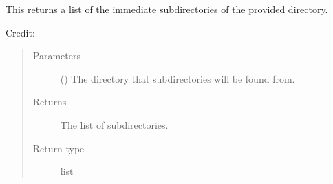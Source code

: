 \documentclass[letterpaper,10pt,english]{sphinxmanual}
\begin{document}

\begin{fulllineitems}
\label{\detokenize{docstrings/ifa_smeargle.core.io:ifa_smeargle.core.io.get_subdirectories}}
This returns a list of the immediate subdirectories of the
provided directory.

Credit: 
\begin{quote}\begin{description}
\item[{Parameters}] \leavevmode
{} () \textendash{} The directory that subdirectories will be found from.

\item[{Returns}] \leavevmode
{} \textendash{} The list of subdirectories.

\item[{Return type}] \leavevmode
list

\end{description}\end{quote}

\end{fulllineitems}

\end{document}
